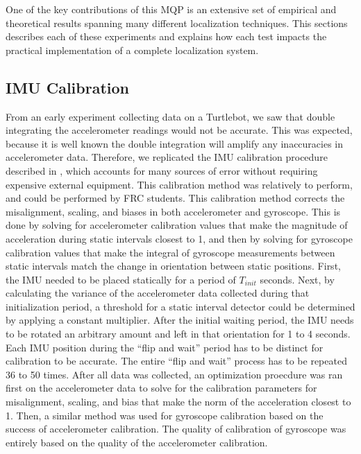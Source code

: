 \documentclass{article}
\begin{document}
  One of the key contributions of this MQP is an extensive set of empirical and theoretical results spanning many different localization techniques. This sections describes each of these experiments and explains how each test impacts the practical implementation of a complete localization system.

  \subsection{IMU Calibration} \label{section:imu_calibration}

    From an early experiment collecting data on a Turtlebot, we saw that double integrating the accelerometer readings would not be accurate. This was expected, because it is well known the double integration will amplify any inaccuracies in accelerometer data. Therefore, we replicated the IMU calibration procedure described in \cite{tedaldi_robust_2014}, which accounts for many sources of error without requiring expensive external equipment. This calibration method was relatively to perform, and could be performed by FRC students. This calibration method corrects the misalignment, scaling, and biases in both accelerometer and gyroscope. This is done by solving for accelerometer calibration values that make the magnitude of acceleration during static intervals closest to 1, and then by solving for gyroscope calibration values that make the integral of gyroscope measurements between static intervals match the change in orientation between static positions. First, the IMU needed to be placed statically for a period of $T_{init}$ seconds. Next, by calculating the variance of the accelerometer data collected during that initialization period, a threshold for a static interval detector could be determined by applying a constant multiplier. After the initial waiting period, the IMU needs to be rotated an arbitrary amount and left in that orientation for 1 to 4 seconds. Each IMU position during the ``flip and wait'' period has to be distinct for calibration to be accurate. The entire ``flip and wait'' process has to be repeated 36 to 50 times. After all data was collected, an optimization proecdure was ran first on the accelerometer data to solve for the calibration parameters for misalignment, scaling, and bias that make the norm of the acceleration closest to 1. Then, a similar method was used for gyroscope calibration based on the success of accelerometer calibration. The quality of calibration of gyroscope was entirely based on the quality of the accelerometer calibration.
\end{document}
